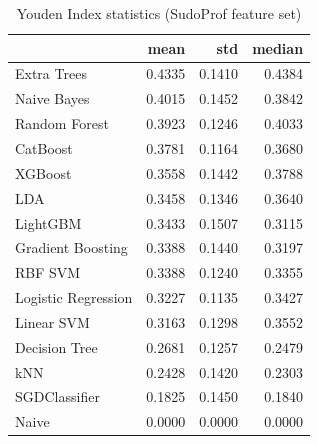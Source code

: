 \begin{table}
\caption{Youden Index statistics (SudoProf feature set)}
\label{tab:youden_SudoProf_stats}
\begin{tabular}{lrrr}
\toprule
 & mean & std & median \\
\midrule
Extra Trees & 0.4335 & 0.1410 & 0.4384 \\
Naive Bayes & 0.4015 & 0.1452 & 0.3842 \\
Random Forest & 0.3923 & 0.1246 & 0.4033 \\
CatBoost & 0.3781 & 0.1164 & 0.3680 \\
XGBoost & 0.3558 & 0.1442 & 0.3788 \\
LDA & 0.3458 & 0.1346 & 0.3640 \\
LightGBM & 0.3433 & 0.1507 & 0.3115 \\
Gradient Boosting & 0.3388 & 0.1440 & 0.3197 \\
RBF SVM & 0.3388 & 0.1240 & 0.3355 \\
Logistic Regression & 0.3227 & 0.1135 & 0.3427 \\
Linear SVM & 0.3163 & 0.1298 & 0.3552 \\
Decision Tree & 0.2681 & 0.1257 & 0.2479 \\
kNN & 0.2428 & 0.1420 & 0.2303 \\
SGDClassifier & 0.1825 & 0.1450 & 0.1840 \\
Naive & 0.0000 & 0.0000 & 0.0000 \\
\bottomrule
\end{tabular}
\end{table}
